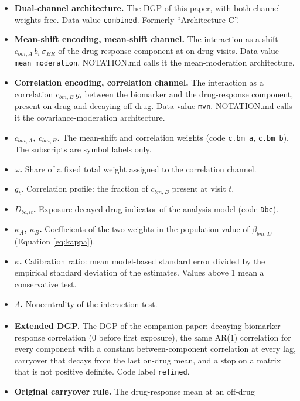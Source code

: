 \documentclass[
  11pt,
]{article}
\providecommand{\tightlist}{%
  \setlength{\itemsep}{0pt}\setlength{\parskip}{0pt}}
\begin{document}
\begin{itemize}
\tightlist
\item
  \textbf{Dual-channel architecture.} The DGP of this paper, with both
  channel weights free. Data value \texttt{combined}. Formerly
  ``Architecture C''.
\item
  \textbf{Mean-shift encoding, mean-shift channel.} The interaction as a
  shift \(c_{bm,A}\, b_i\, \sigma_{BR}\) of the drug-response component
  at on-drug visits. Data value \texttt{mean\_moderation}. NOTATION.md calls
  it the mean-moderation architecture.
\item
  \textbf{Correlation encoding, correlation channel.} The interaction as a
  correlation \(c_{bm,B}\, g_t\) between the biomarker and the
  drug-response component, present on drug and decaying off drug.
  Data value \texttt{mvn}. NOTATION.md calls it the covariance-moderation
  architecture.
\item
  \textbf{\(c_{bm,A}\), \(c_{bm,B}\).} The mean-shift and correlation weights
  (code \texttt{c.bm\_a}, \texttt{c.bm\_b}). The subscripts are symbol labels only.
\item
  \textbf{\(\omega\).} Share of a fixed total weight assigned to the
  correlation channel.
\item
  \textbf{\(g_t\).} Correlation profile: the fraction of \(c_{bm,B}\) present
  at visit \(t\).
\item
  \textbf{\(D_{bc,it}\).} Exposure-decayed drug indicator of the analysis
  model (code \texttt{Dbc}).
\item
  \textbf{\(\kappa_A\), \(\kappa_B\).} Coefficients of the two weights in the
  population value of \(\beta_{bm:D}\) (Equation \eqref{eq:kappa}).
\item
  \textbf{\(\kappa\).} Calibration ratio: mean model-based standard error
  divided by the empirical standard deviation of the estimates.
  Values above 1 mean a conservative test.
\item
  \textbf{\(\Lambda\).} Noncentrality of the interaction test.
\item
  \textbf{Extended DGP.} The DGP of the companion paper\textsuperscript{}: decaying biomarker-response correlation (0
  before first exposure), the same AR(1) correlation for every
  component with a constant between-component correlation at every
  lag, carryover that decays from the last on-drug mean, and a stop on
  a matrix that is not positive definite. Code label \texttt{refined}.
\item
  \textbf{Original carryover rule.} The drug-response mean at an off-drug

\end{itemize}
\end{document}
